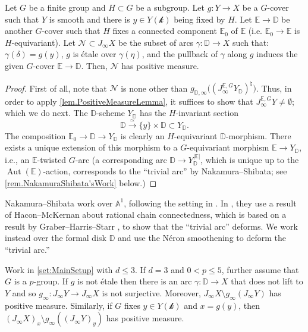 \documentclass[12pt]{amsart}
\theoremstyle{plain}   %
\theoremstyle{definition}    %
\theoremstyle{remark}    %
\numberwithin{equation}{theorem}
\DeclareMathOperator{\Aut}{{Aut}}
\newcommand{\kay}{\mathcal{k}}
\newcommand{\sN}{\mathcal{N}}
\newcommand{\bA}{\mathbb{A}}
\newcommand{\bD}{\mathbb{D}}
\newcommand{\bE}{\mathbb{E}}
\begin{document}
\begin{corollary} \label{Cor.AbundanceNonLiftableArcs}
Let $G$ be a finite group and $H\subset G$ be a subgroup. Let $g\colon Y\to X$ be a $G$-cover such that $Y$ is smooth and there is $y \in Y(\kay)$ being fixed by $H$. 
Let  $\bE\to \bD$ be another $G$-cover such that $H$ fixes a connected component $\bE_0$ of $\bE$ (i.e. $\bE_0 \to \bE$ is $H$-equivariant). Let $\sN \subset J_{\infty} X$ be the subset of arcs $\gamma \colon \bD\to X$ such that: $\gamma(\delta) = g(y)$,  $g$ is \'etale over $\gamma(\eta)$, and the pullback of $\gamma$ along $g$ induces the given $G$-cover $\bE\to \bD$. Then, $\sN$ has positive measure.
\end{corollary}

\begin{proof}
First of all, note that $\sN$ is none other than $g_{\bD,\infty}\big((J_\infty^{\bE,G}Y_\bD)^\natural\big)$. Thus, in order to apply \autoref{lem.PositiveMeasureLemma}, it suffices to show that $J_\infty^{\bE,G}Y\ne \emptyset$; which we do next.  The $\bD$-scheme $Y_\bD$ has the $H$-invariant section
\[
\bD \xrightarrow{\simeq} \{y\}\times \bD \subset Y_\bD.
\]
The composition $\bE_0\to \bD \to Y_\bD$ is clearly an $H$-equivariant $\bD$-morphism. There exists a unique extension of this morphism to a $G$-equivariant morphism $\bE\to Y_\bD$, i.e., an $\bE$-twisted $G$-arc (a corresponding arc $\bD\to Y_\bD^{|\bE|}$, which is unique up to the $\Aut(\bE)$-action, corresponds to the ``trivial arc'' by Nakamura--Shibata; see \autoref{rem.NakamuraShibata'sWork} below.)
\end{proof}

\begin{remark}\label{rem.NakamuraShibata'sWork}
Nakamura--Shibata work over $\bA^1$, following the setting in \cite{DenefLoeserMotivicIntegrationQuotientSingularitiesMcKayCorrespondnence}. In \cite[Claim 5.2]{NakamuraShibataInversionOdAdjunctionForQuotientSingularities}, they use a result of Hacon--McKernan \cite{HaconMcKernanOnShokurovsRCC} about rational chain connectedness, which is based on a result by  Graber--Harris--Starr \cite{GraberHArrisStarrFamiliesofRCCVarieties}, to show that the ``trivial arc'' deforms. We work instead over the formal disk $\bD$ and use the N\'eron smoothening to deform the ``trivial arc.''
\end{remark}

\begin{proposition} \label{pro.SecondProposition} 
Work in \autoref{set:MainSetup} with $d \leq 3$. If $d = 3$ and $0<p \leq 5$, further assume that $G$ is a $p$-group. If $g$ is not \'etale then there is an arc $\gamma \colon \bD \to X$ that does not lift to $Y$ and so $g_{\infty} \colon J_{\infty} Y \to J_{\infty} X$ is not surjective. Moreover, $J_{\infty} X \setminus g_{\infty} ( J_{\infty} Y )$ has positive measure. Similarly, if $G$ fixes $y \in Y(\kay)$ and $x=g(y)$, then $(J_{\infty} X)_x \setminus g_{\infty} ( (J_{\infty} Y)_y )$ has positive measure.
\end{proposition}
\end{document}
